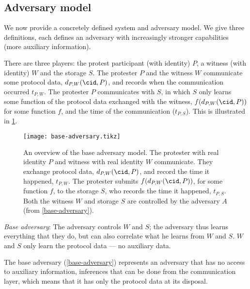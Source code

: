 \subsection{Adversary model}%
\label{formal-adversary-model}

We now provide a concretely defined system and adversary model.
We give three definitions, each defines an adversary with increasingly stronger 
capabilities (\ie more auxiliary information).

There are three players: the protest participant (with identity) \(P\), a 
witness (with identity) \(W\) and the storage \(S\).
The protester \(P\) and the witness \(W\) communicate some protocol data,
\(d_{P,W}(\cid, P)\), and records when the communication occurred \(t_{P,W}\).
The protester \(P\) communicates with \(S\), in which \(S\) only learns some 
function of the protocol data exchanged with the witness, \(f(d_{P,W}(\cid, 
  P))\) for some function \(f\), and the time of the communication 
(\(t_{P,S}\)).
This is illustrated in \cref{fig:base-adversary}.

\begin{figure}
  \centering
  \texttt{[image: base-adversary.tikz]}
  \caption{\label{fig:base-adversary}%
    An overview of the base adversary model.
    The protester with real identity \(P\) and witness with real identity \(W\) 
    communicate.
    They exchange protocol data, \(d_{P,W}(\cid, P)\), and record the time it 
    happened, \(t_{P,W}\).
    The protester submits \(f(d_{P,W}(\cid, P))\), for some function \(f\), to 
    the storage \(S\), who records the time it happened, \(t_{P,S}\).
    Both the witness \(W\) and storage \(S\) are controlled by the adversary 
    \(A\) (from \cref{base-adversary}).
  }
\end{figure}

\begin{adversaries}
\item\label{base-adversary}
  \emph{Base adversary}:
  The adversary controls \(W\) and \(S\); the adversary thus learns everything 
  that they do, but can also correlate what he learns from \(W\) and \(S\).
  \(W\) and \(S\) only learn the protocol data --- no auxiliary data.
\end{adversaries}

The base adversary (\cref{base-adversary}) represents an adversary that has no 
access to auxiliary information, \eg inferences that can be done from the 
communication layer, which means that it has only the protocol data at its 
disposal.

